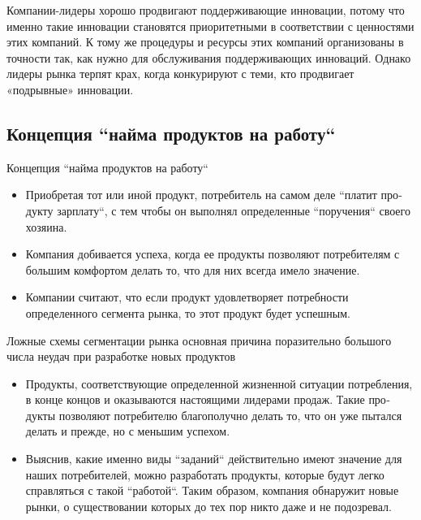 \documentclass[_Venture_p3.tex]{subfiles}
\begin{document}
\begin{frame}
Компании-лидеры хорошо продвигают поддерживающие инновации, потому что именно такие инновации становятся приоритетными в соответствии с ценностями этих компаний. К тому же процедуры и ресурсы этих компаний организованы в точности так, как нужно для обслуживания поддерживающих инноваций. Однако лидеры рынка терпят крах, когда конкурируют с теми, кто продвигает «подрывные» инновации.
\end{frame}

\subsection{Концепция ``найма продуктов на работу``}
\begin{frame}{Концепция ``найма продуктов на работу``	}
\begin{itemize}
	\small
	\item Приобретая тот или иной продукт, потребитель на самом деле ``платит про­дукту зарплату``, с тем чтобы он выполнял определенные ``поручения`` своего хозяина.
	\item Компания добивается успеха, когда ее продукты позволяют потребителям с большим комфортом делать то, что для них всегда имело значение.
	\item Компании считают, что если продукт удовлетворяет потребности определенного сегмента рынка, то этот продукт будет успешным. 
\end{itemize}
\end{frame}

\begin{frame}{Ложные схемы сегментации рынка }{основная причина поразительно большого числа неудач при разработке новых продуктов}
\begin{itemize}
	\small
	\item Продукты,  соответствующие определенной жизненной ситуации потребления, в конце концов и оказываются настоящими лидерами продаж. Такие про­дукты позволяют потребителю благополучно делать то, что он уже пытался делать и прежде, но с меньшим успехом.
	\item Выяснив, какие именно виды ``заданий`` действительно имеют значение для наших потребителей, можно разработать продукты, которые будут легко справляться с такой ``работой``. Таким образом, компания обнаружит новые рынки, о существовании которых до тех пор никто даже и не подозревал. 
\end{itemize}
\end{frame}
\end{document}
